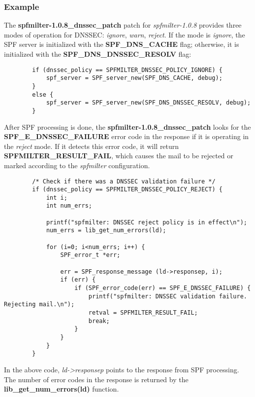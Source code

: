 \documentclass[12pt]{article}
\newcommand{\cmd}[1]{{\em #1}}
\newcommand{\const}[1]{{\bf #1}}
\newcommand{\func}[1]{{\bf #1}}
\newcommand{\path}[1]{{\bf #1}}
\newcommand{\var}[1]{{\em #1}}
\begin{document}

\subsubsection{Example}

The \path{spfmilter-1.0.8\_dnssec\_patch} patch for \cmd{spfmilter-1.0.8}
provides three modes of operation for DNSSEC:  {\it ignore}, {\it warn},
{\it reject}.  If the mode is {\it ignore}, the SPF server is initialized
with the \const{SPF\_\-DNS\_\-CACHE} flag; otherwise, it is initialized
with the \const{SPF\_\-DNS\_\-DNS\-SEC\_\-RESOLV} flag:

\begin{verbatim}
        if (dnssec_policy == SPFMILTER_DNSSEC_POLICY_IGNORE) {
            spf_server = SPF_server_new(SPF_DNS_CACHE, debug);
        }
        else {
            spf_server = SPF_server_new(SPF_DNS_DNSSEC_RESOLV, debug);
        }
\end{verbatim}

After SPF processing is done, the \path{spfmilter-1.0.8\_dnssec\_patch} looks
for the \const{SPF\_\-E\_\-DNS\-SEC\_\-FAILURE} error code in the response if
it is operating in the {\it reject} mode.  If it detects this error code, it
will return \const{SPF\-MIL\-TER\_\-RESULT\_\-FAIL}, which causes the mail to
be rejected or marked according to the \cmd{spfmilter} configuration.

\begin{verbatim}
        /* Check if there was a DNSSEC validation failure */
        if (dnssec_policy == SPFMILTER_DNSSEC_POLICY_REJECT) {
            int i;
            int num_errs;

            printf("spfmilter: DNSSEC reject policy is in effect\n");
            num_errs = lib_get_num_errors(ld);

            for (i=0; i<num_errs; i++) {
                SPF_error_t *err;

                err = SPF_response_message (ld->responsep, i);
                if (err) {
                    if (SPF_error_code(err) == SPF_E_DNSSEC_FAILURE) {
                        printf("spfmilter: DNSSEC validation failure.
Rejecting mail.\n");
                        retval = SPFMILTER_RESULT_FAIL;
                        break;
                    }
                }
            }
        }
\end{verbatim}

In the above code, \var{ld->responsep} points to the response from SPF
processing.  The number of error codes in the response is returned by the
\func{lib\_get\_num\_errors(ld)} function.
\end{document}
